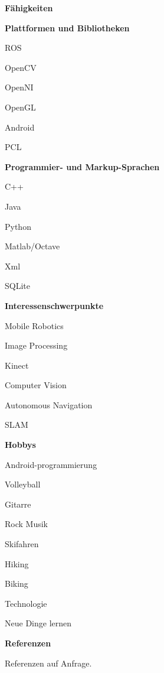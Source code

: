 \documentclass[a4paper,12pt,final]{memoir}
\newcommand{\SmallSep}{\vspace{0.5em}}
\newcommand{\CVSection}[1]
	{\Large\textbf{#1}\par
	\SmallSep\normalsize\normalfont}
\newcommand{\CVItem}[1]
	{\textbf{\color{MidnightBlue} #1}}
\begin{document}
\CVSection{F\"{a}higkeiten}
\CVItem{Plattformen und Bibliotheken}
\begin{multicols}{3}
\begin{compactitem}[\color{MidnightBlue}$\circ$]
	\item ROS 
	\item OpenCV
	\item OpenNI 
	\item OpenGL
	\item Android
	\item PCL
\end{compactitem}
\end{multicols}
\SmallSep

\CVItem{Programmier- und Markup-Sprachen}
\begin{multicols}{3}
\begin{compactitem}[\color{MidnightBlue}$\circ$]
	\item C++ 
	\item Java 
	\item Python 
	\item Matlab/Octave 
	\item Xml
	\item SQLite
\end{compactitem}
\end{multicols}
\SmallSep

\CVItem{Interessenschwerpunkte}
\begin{compactitem}[\color{MidnightBlue}$\circ$]
	\item Mobile Robotics
	\item Image Processing 
	\item Kinect 
	\item Computer Vision 
	\item Autonomous Navigation
	\item SLAM
\end{compactitem}
\SmallSep

\CVSection{Hobbys}
\begin{compactitem}[\color{MidnightBlue}$\circ$]
	\item Android-programmierung
	\item Volleyball
	\item Gitarre 
	\item Rock Musik
	\item Skifahren
	\item Hiking
	\item Biking
	\item Technologie
	\item Neue Dinge lernen
\end{compactitem}
\SmallSep

\CVSection{Referenzen}
Referenzen auf Anfrage.

\clearpage
\framebreak

\end{document}
